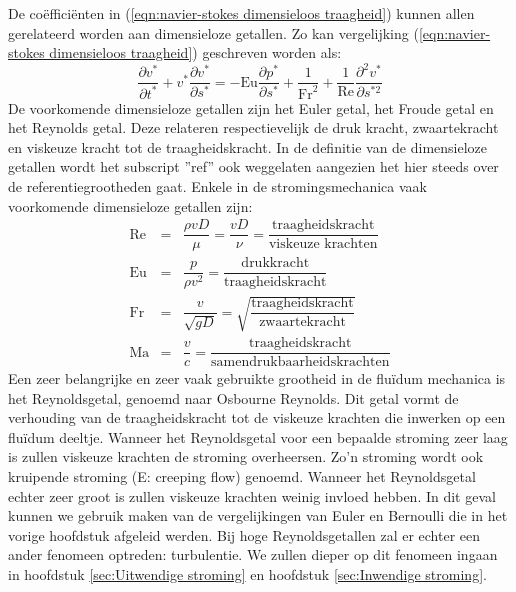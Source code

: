 De coëfficiënten in (\ref{eqn:navier-stokes dimensieloos traagheid}) kunnen allen gerelateerd worden aan dimensieloze getallen. Zo kan vergelijking (\ref{eqn:navier-stokes dimensieloos traagheid}) geschreven worden als:
\begin{equation}
	\frac{\partial v^*}{\partial t^*} + v^* \frac{\partial v^*}{\partial s^*} =  -\text{Eu} \frac{\partial p^*}{\partial s^*} + \frac{1}{\text{Fr}^2} + \frac{1}{\text{Re}} \frac{\partial^2 v^*}{\partial s^{*2}}
	\label{eqn:navier-stokes dimensieloze getallen}
\end{equation}
De voorkomende dimensieloze getallen zijn het Euler getal, het Froude getal en het Reynolds getal. Deze relateren respectievelijk de druk kracht, zwaartekracht en viskeuze kracht tot de traagheidskracht. In de definitie van de dimensieloze getallen wordt het subscript ''ref'' ook weggelaten aangezien het hier steeds over de referentiegrootheden gaat. Enkele in de stromingsmechanica vaak voorkomende dimensieloze getallen zijn:
\begin{eqnarray}
	\text{Re} &=& \dfrac{\rho v D}{\mu} = \dfrac{v D}{\nu} = \dfrac{\text{traagheidskracht}}{\text{viskeuze krachten}} \label{eqn:Reynolds} \\
	\text{Eu} &=& \dfrac{p}{\rho v^2} = \dfrac{\text{drukkracht}}{\text{traagheidskracht}} \label{eqn:Euler} \\
	\text{Fr} &=& \dfrac{v}{\sqrt{g D}} = \sqrt{\dfrac{\text{traagheidskracht}}{\text{zwaartekracht}}} \\
	\text{Ma} &=& \dfrac{v}{c} = \dfrac{\text{traagheidskracht}}{\text{samendrukbaarheidskrachten}}
	\label{eqn:Dimensieloze getallen}
\end{eqnarray}
Een zeer belangrijke en zeer vaak gebruikte grootheid in de fluïdum mechanica is het Reynoldsgetal, genoemd naar Osbourne Reynolds. Dit getal vormt de verhouding van de traagheidskracht tot de viskeuze krachten die inwerken op een fluïdum deeltje. Wanneer het Reynoldsgetal voor een bepaalde stroming zeer laag is zullen viskeuze krachten de stroming overheersen. Zo'n stroming wordt ook kruipende stroming (E: creeping flow) genoemd. Wanneer het Reynoldsgetal echter zeer groot is zullen viskeuze krachten weinig invloed hebben. In dit geval kunnen we gebruik maken van de vergelijkingen van Euler en Bernoulli die in het vorige hoofdstuk afgeleid werden. Bij hoge Reynoldsgetallen zal er echter een ander fenomeen optreden: turbulentie. We zullen dieper op dit fenomeen ingaan in hoofdstuk \ref{sec:Uitwendige stroming} en hoofdstuk \ref{sec:Inwendige stroming}.

